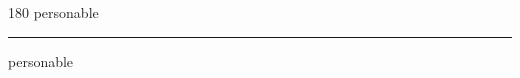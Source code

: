 
\begin{frame}
\begin{center}
\begin{turn}{180}
{\fontsize{2.5cm}{1em}\selectfont personable}
\end{turn}
\vspace{1em}\par  
\hrule
\vspace{1em}\par  
{\fontsize{2.5cm}{1em}\selectfont personable}
\end{center}
\end{frame}
